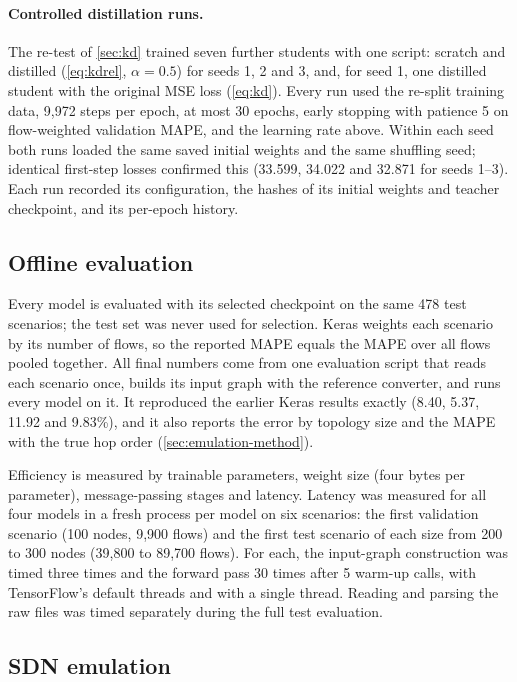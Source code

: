 \paragraph{Controlled distillation runs.} The re-test of \cref{sec:kd} trained seven further students with one script: scratch and distilled (\cref{eq:kdrel}, $\alpha = 0.5$) for seeds 1, 2 and 3, and, for seed 1, one distilled student with the original MSE loss (\cref{eq:kd}). Every run used the re-split training data, 9,972 steps per epoch, at most 30 epochs, early stopping with patience 5 on flow-weighted validation MAPE, and the learning rate above. Within each seed both runs loaded the same saved initial weights and the same shuffling seed; identical first-step losses confirmed this (33.599, 34.022 and 32.871 for seeds 1--3). Each run recorded its configuration, the hashes of its initial weights and teacher checkpoint, and its per-epoch history.

\subsection{Offline evaluation}
\label{sec:metrics}

Every model is evaluated with its selected checkpoint on the same 478 test scenarios; the test set was never used for selection. Keras weights each scenario by its number of flows, so the reported MAPE equals the MAPE over all flows pooled together. All final numbers come from one evaluation script that reads each scenario once, builds its input graph with the reference converter, and runs every model on it. It reproduced the earlier Keras results exactly (8.40, 5.37, 11.92 and 9.83\%), and it also reports the error by topology size and the MAPE with the true hop order (\cref{sec:emulation-method}).

Efficiency is measured by trainable parameters, weight size (four bytes per parameter), message-passing stages and latency. Latency was measured for all four models in a fresh process per model on six scenarios: the first validation scenario (100 nodes, 9,900 flows) and the first test scenario of each size from 200 to 300 nodes (39,800 to 89,700 flows). For each, the input-graph construction was timed three times and the forward pass 30 times after 5 warm-up calls, with TensorFlow's default threads and with a single thread. Reading and parsing the raw files was timed separately during the full test evaluation.

\subsection{SDN emulation}
\label{sec:emulation-setup}

